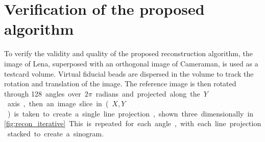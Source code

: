 \documentclass{osa-article}
\begin{document}
\section*{Verification of the proposed algorithm}

To verify the validity and quality of the proposed reconstruction algorithm, the image of Lena, superposed with an orthogonal image of Cameraman, is used as a testcard volume.
Virtual fiducial beads are dispersed in the volume to track the rotation and translation of the image.%
The reference image is then rotated through \SI{128} angles over \(2\pi \) radians and projected along the \(Y\) axis, then an image slice in (\(X,Y\)) is taken to create a single line projection, shown three dimensionally in \figurename~\ref{fig:recon_iterative}.
This is repeated for each angle,  with each line projection stacked to create a sinogram.%

\end{document}

